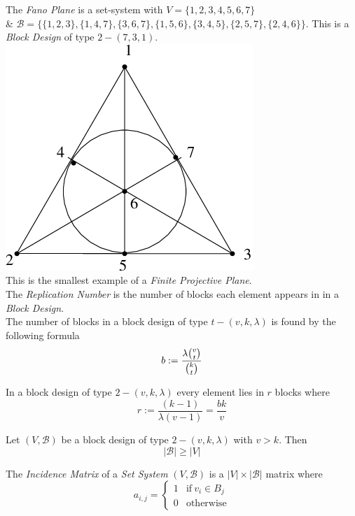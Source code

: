 \documentclass[11pt,a4paper]{article}
\begin{document}
The \textit{Fano Plane} is a set-system with  $V=\{1,2,3,4,5,6,7\}$\\
\& $\mathcal{B}=\{\{1,2,3\},\{1,4,7\},\{3,6,7\},\{1,5,6\},\{3,4,5\},\{2,5,7\},\{2,4,6\}\}$. This is a \textit{Block Design} of type $2-(7,3,1)$.\\
\includegraphics[scale=0.25]{img/fanoplane.png}\\
\NB This is the smallest example of a \textit{Finite Projective Plane}.\\

The \textit{Replication Number} is the number of blocks each element appears in in a \textit{Block Design}.\\

The number of blocks in a block design of type $t-(v,k,\lambda)$ is found by the following formula
$$b:=\frac{\lambda{{v}\choose{t}}}{{{k}\choose{t}}}$$

In a block design of type $2-(v,k,\lambda)$ every element lies in $r$ blocks where
$$r:=\frac{(k-1)}{\lambda(v-1)}=\frac{bk}{v}$$

Let $(V,\mathcal{B})$ be a block design of type $2-(v,k,\lambda)$ with $v>k$. Then$$|\mathcal{B}|\geq|V|$$

The \textit{Incidence Matrix} of a \textit{Set System} $(V,\mathcal{B})$ is a $|V|\times|\mathcal{B}|$ matrix where
$$a_{i,j}=\begin{cases}1&\mathrm{if}\ v_i\in B_j\\0&\mathrm{otherwise}\end{cases}$$
\end{document}
